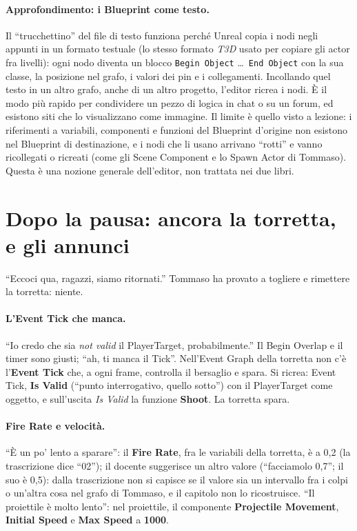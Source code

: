 \paragraph{Approfondimento: i Blueprint come testo.} Il ``trucchettino'' del file di testo
funziona perché Unreal copia i nodi negli appunti in un formato testuale (lo stesso
formato \emph{T3D} usato per copiare gli actor fra livelli): ogni nodo diventa un blocco
\texttt{Begin Object} \dots\ \texttt{End Object} con la sua classe, la posizione nel grafo,
i valori dei pin e i collegamenti. Incollando quel testo in un altro grafo, anche di un
altro progetto, l'editor ricrea i nodi. È il modo più rapido per condividere un pezzo di
logica in chat o su un forum, ed esistono siti che lo visualizzano come immagine. Il
limite è quello visto a lezione: i riferimenti a variabili, componenti e funzioni del
Blueprint d'origine non esistono nel Blueprint di destinazione, e i nodi che li usano
arrivano ``rotti'' e vanno ricollegati o ricreati (come gli Scene Component e lo Spawn
Actor di Tommaso). Questa è una nozione generale dell'editor, non trattata nei due libri.

\section{Dopo la pausa: ancora la torretta, e gli annunci}
\label{ue11:sec:annunci}

``Eccoci qua, ragazzi, siamo ritornati.'' Tommaso ha provato a togliere e rimettere la
torretta: niente.

\paragraph{L'Event Tick che manca.} ``Io credo che sia \emph{not valid} il PlayerTarget,
probabilmente.'' Il Begin Overlap e il timer sono giusti; ``ah, ti manca il Tick''.
Nell'Event Graph della torretta non c'è l'\textbf{Event Tick} che, a ogni frame, controlla
il bersaglio e spara. Si ricrea: Event Tick, \textbf{Is Valid} (``punto interrogativo,
quello sotto'') con il PlayerTarget come oggetto, e sull'uscita \emph{Is Valid} la
funzione \textbf{Shoot}. La torretta spara.

\paragraph{Fire Rate e velocità.} ``È un po' lento a sparare'': il \textbf{Fire Rate}, fra
le variabili della torretta, è a 0,2 (la trascrizione dice ``02''); il docente suggerisce
un altro valore (``facciamolo 0,7''; il suo è 0,5): dalla trascrizione non si capisce se
il valore sia un intervallo fra i colpi o un'altra cosa nel grafo di Tommaso, e il capitolo
non lo ricostruisce. ``Il proiettile è molto lento'': nel proiettile, il componente
\textbf{Projectile Movement}, \textbf{Initial Speed} e \textbf{Max Speed} a \textbf{1000}.


